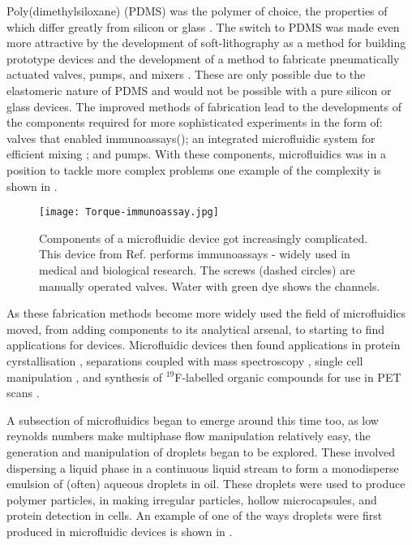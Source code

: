 Poly(dimethylsiloxane) (PDMS) was the polymer of choice, the properties of which differ greatly
from silicon or glass \citep{ng2002components,whitesides2001flexible}. The switch to PDMS was made even
more attractive by the development of soft-lithography as a method for building prototype
devices \citep{mcdonald2000fabrication} and the development of a method to fabricate pneumatically actuated valves,
pumps, and mixers \citep{mcdonald2000fabrication}. These are only possible due to the elastomeric nature of PDMS
and would not be possible with a pure silicon or glass devices.
The improved methods of fabrication lead to the developments of the components required for more sophisticated
experiments in the form of: valves that enabled immunoassays()\citep{weibel2005torque}; an integrated
microfluidic system for efficient mixing \citep{gunther2005micromixing}; and pumps\citep{laser2004review}.
With these components, microfluidics was in a position to tackle more complex problems one example of the complexity is shown in .


\begin{figure}
  \begin{center}
  \texttt{[image: Torque-immunoassay.jpg]}
  \end{center}
  \caption{Components of a microfluidic device got increasingly complicated. This device from Ref.\citep{weibel2005torque} performs
  immunoassays - widely used in medical and biological research. The screws (dashed circles) are manually operated valves. Water with green dye
  shows the channels.}
  \label{fig:immunoassay}
\end{figure}


As these fabrication methods become more widely used the field of microfluidics moved, from
adding components to its analytical arsenal, to starting to find applications for devices.
Microfluidic devices then found applications in protein cyrstallisation \citep{hansen2002robust},
separations coupled with mass spectroscopy \citep{ramsey1997generating}, single cell manipulation \citep{wheeler2003microfluidic},
and synthesis of $^{19}$F-labelled organic compounds for use in PET scans \citep{lee2005multistep}.

A subsection of microfluidics began to emerge around this time too, as
low reynolds numbers make multiphase flow manipulation
relatively easy, the generation and manipulation of droplets\citep{thorsen2001dynamic, link2004geometrically, tan2004design} began to be explored.
These involved dispersing a liquid phase in a continuous
liquid stream to form a monodisperse emulsion of (often) aqueous droplets in oil. These droplets
were used to produce polymer particles\citep{nie2005polymer}, in making irregular particles\citep{nisisako2007formation},
hollow microcapsules\citep{utada2005monodisperse}, and protein detection in cells\citep{huebner2007quantitative}. An example of one of the ways droplets were first
produced in microfluidic devices is shown in .

